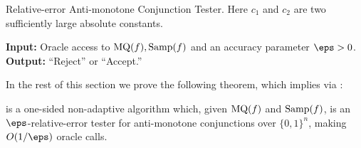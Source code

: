 \documentclass[11pt]{article}
\theoremstyle{definition}
\begin{document}
\begin{algorithm}[t!] 
\caption{Relative-error Anti-monotone Conjunction Tester. 
{Here $c_1$ and $c_2$ are two\\ sufficiently large absolute constants. } }

\label{algo: mono conjunction tester}



\vspace{0.15cm}\textbf{Input: } Oracle access to $\mathrm{MQ}(f), \mathrm{Samp}(f)$ and an accuracy parameter $\eps > 0$. \\
\textbf{Output: } ``Reject'' or ``Accept.''

\end{algorithm}







In the rest of this section we prove the following theorem, which implies 
 via :

\begin{theorem}  \label{thm:acceptable-monotone}
 is a one-sided non-adaptive
algorithm which, given $\mathrm{MQ}(f)$ and $\mathrm{Samp}(f)$,
is an $\eps$-relative-error tester for anti-monotone conjunctions over $\{0,1\}^n$, making $O(1/\eps)$ oracle calls.
\end{theorem}
\end{document}
